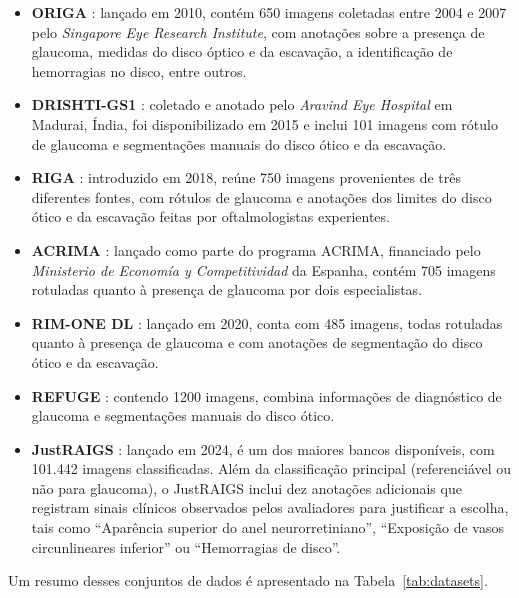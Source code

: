 \documentclass[12pt]{article}
\begin{document}
\begin{itemize}
    \item \textbf{ORIGA} \cite{origa}: lançado em 2010, contém 650 imagens coletadas entre 2004 e 2007 pelo \textit{Singapore Eye Research Institute}, com anotações sobre a presença de glaucoma, medidas do disco óptico e da escavação, a identificação de hemorragias no disco, entre outros.
    \item \textbf{DRISHTI-GS1} \cite{drishti_1} \cite{drishti_2}: coletado e anotado pelo \textit{Aravind Eye Hospital} em Madurai, Índia, foi disponibilizado em 2015 e inclui 101 imagens com rótulo de glaucoma e segmentações manuais do disco ótico e da escavação.
    \item \textbf{RIGA} \cite{riga}: introduzido em 2018, reúne 750 imagens provenientes de três diferentes fontes, com rótulos de glaucoma e anotações dos limites do disco ótico e da escavação feitas por oftalmologistas experientes.
    \item \textbf{ACRIMA} \cite{diaz-pinto2019cnns}: lançado como parte do programa ACRIMA, financiado pelo \textit{Ministerio de Economía y Competitividad} da Espanha, contém 705 imagens rotuladas quanto à presença de glaucoma por dois especialistas.
    \item \textbf{RIM-ONE DL} \cite{rim-one-dl}: lançado em 2020, conta com 485 imagens, todas rotuladas quanto à presença de glaucoma e com anotações de segmentação do disco ótico e da escavação.
    \item \textbf{REFUGE} \cite{refuge}: contendo 1200 imagens, combina informações de diagnóstico de glaucoma e segmentações manuais do disco ótico.
    \item \textbf{JustRAIGS} \cite{justraigs}: lançado em 2024, é um dos maiores bancos disponíveis, com 101.442 imagens classificadas. Além da classificação principal (referenciável ou não para glaucoma), o JustRAIGS inclui dez anotações adicionais que registram sinais clínicos observados pelos avaliadores para justificar a escolha, tais como ``Aparência superior do anel neurorretiniano'', ``Exposição de vasos circunlineares inferior'' ou ``Hemorragias de disco''.
\end{itemize}

Um resumo desses conjuntos de dados é apresentado na Tabela~\ref{tab:datasets}.
\end{document}
